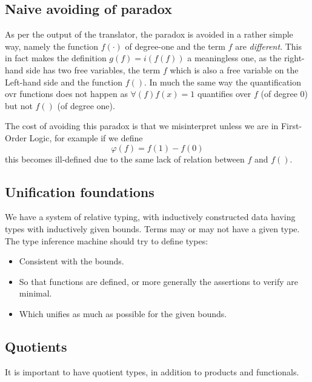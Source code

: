 \documentclass{amsart}
\begin{document}
\subsection*{Naive avoiding of paradox}

As per the output of the translator, the paradox is avoided in a rather simple way, namely the function $f(\cdot)$ of degree-one and the term $f$ are \emph{different}. This in fact makes the definition $g(f) = i(f(f))$ a meaningless one, as the right-hand side has two free variables, the term $f$ which is also a free variable on the Left-hand side and the function $f()$. In much the same way the quantification ovr functions does not happen as $\forall(f) f(x)=1$ quantifies over $f$ (of degree $0$) but not $f()$ (of degree one).

The cost of avoiding this paradox is that we misinterpret unless we are in First-Order Logic, for example if we define 
$$\varphi(f) = f(1) - f(0)$$
this becomes ill-defined due to the same lack of relation between $f$ and $f()$.

\subsection*{Unification foundations}

We have a system of relative typing, with inductively constructed data having types with inductively given bounds. Terms may or may not have a given type.  The type inference machine should try to define types:
\begin{itemize}
\item Consistent with the bounds.
\item So that functions are defined, or more generally the assertions to verify are minimal.
\item Which unifies as much as possible for the given bounds.
\end{itemize}

\subsection*{Quotients}

It is important to have quotient types, in addition to products and functionals.
\end{document}

